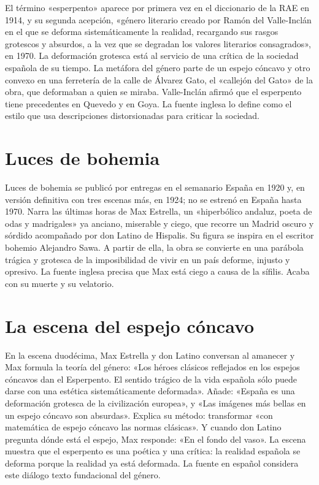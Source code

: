 \documentclass{book}
\begin{document}
El término «esperpento» aparece por primera vez en el diccionario de la RAE en 1914, y su segunda acepción, «género literario creado por Ramón del Valle-Inclán en el que se deforma sistemáticamente la realidad, recargando sus rasgos grotescos y absurdos, a la vez que se degradan los valores literarios consagrados», en 1970. La deformación grotesca está al servicio de una crítica de la sociedad española de su tiempo. La metáfora del género parte de un espejo cóncavo y otro convexo en una ferretería de la calle de Álvarez Gato, el «callejón del Gato» de la obra, que deformaban a quien se miraba. Valle-Inclán afirmó que el esperpento tiene precedentes en Quevedo y en Goya. La fuente inglesa lo define como el estilo que usa descripciones distorsionadas para criticar la sociedad.


\section{Luces de bohemia}

Luces de bohemia se publicó por entregas en el semanario España en 1920 y, en versión definitiva con tres escenas más, en 1924; no se estrenó en España hasta 1970. Narra las últimas horas de Max Estrella, un «hiperbólico andaluz, poeta de odas y madrigales» ya anciano, miserable y ciego, que recorre un Madrid oscuro y sórdido acompañado por don Latino de Hispalis. Su figura se inspira en el escritor bohemio Alejandro Sawa. A partir de ella, la obra se convierte en una parábola trágica y grotesca de la imposibilidad de vivir en un país deforme, injusto y opresivo. La fuente inglesa precisa que Max está ciego a causa de la sífilis. Acaba con su muerte y su velatorio.


\section{La escena del espejo cóncavo}

En la escena duodécima, Max Estrella y don Latino conversan al amanecer y Max formula la teoría del género: «Los héroes clásicos reflejados en los espejos cóncavos dan el Esperpento. El sentido trágico de la vida española sólo puede darse con una estética sistemáticamente deformada». Añade: «España es una deformación grotesca de la civilización europea», y «Las imágenes más bellas en un espejo cóncavo son absurdas». Explica su método: transformar «con matemática de espejo cóncavo las normas clásicas». Y cuando don Latino pregunta dónde está el espejo, Max responde: «En el fondo del vaso». La escena muestra que el esperpento es una poética y una crítica: la realidad española se deforma porque la realidad ya está deformada. La fuente en español considera este diálogo texto fundacional del género.
\end{document}
